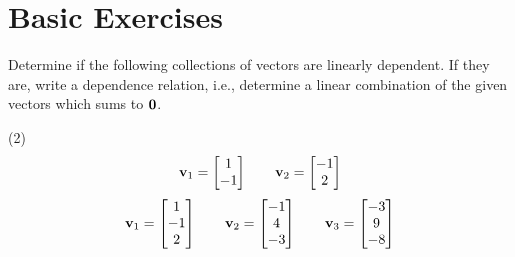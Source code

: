 \section{Basic Exercises}

Determine if the following collections of vectors are linearly
dependent.  If they are, write a dependence relation, i.e., determine
a linear combination of the given vectors which sums to $\mathbf 0$.
\begin{tasks}[style=enumerate](2)
\task
  \begin{align*}
    \mathbf v_{1} = \begin{bmatrix} 1 \\ -1 \end{bmatrix}
    \qquad
    \mathbf v_{2} = \begin{bmatrix} -1 \\ 2 \end{bmatrix}
  \end{align*}
\task
  \begin{align*}
    \mathbf v_1 =
    \begin{bmatrix}
      1 \\ -1 \\ 2
    \end{bmatrix}
    \qquad
    \mathbf v_2 =
    \begin{bmatrix}
      -1 \\ 4 \\ -3
    \end{bmatrix}
    \qquad
    \mathbf v_3 =
    \begin{bmatrix}
      -3 \\ 9 \\ -8
    \end{bmatrix}
  \end{align*}
\end{tasks}
